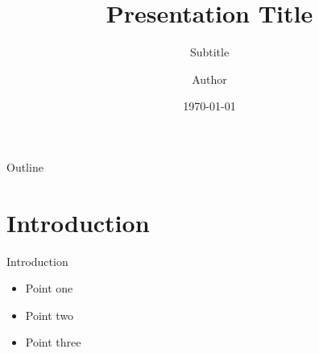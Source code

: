 \documentclass{beamer}
\title{Presentation Title}
\subtitle{Subtitle}
\author{Author}
\institute{Institution}
\date{\today}
\begin{document}
\begin{frame}
\titlepage
\end{frame}

\begin{frame}{Outline}
\tableofcontents
\end{frame}

\section{Introduction}

\begin{frame}{Introduction}
\begin{itemize}
    \item Point one
    \item Point two
    \item Point three
\end{itemize}
\end{frame}
\end{document}
